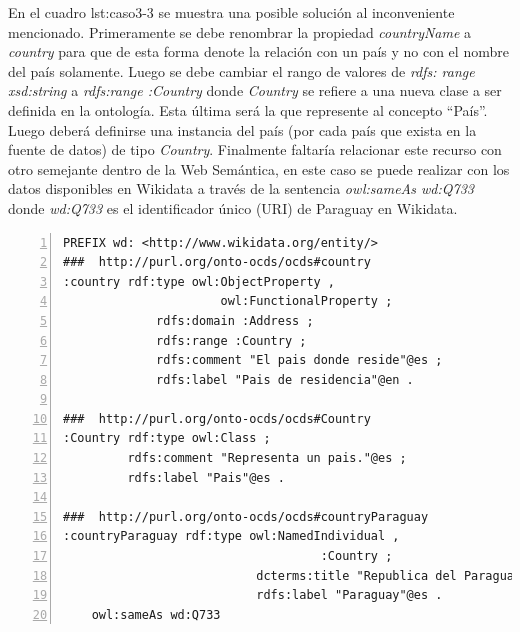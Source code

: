  En el cuadro {lst:caso3-3} se muestra una posible solución al inconveniente mencionado. Primeramente se debe renombrar la propiedad \textit{countryName} a \textit{country} para que de esta forma denote la relación con un país y no con el nombre del país solamente. Luego se debe cambiar el rango de valores de \textit{rdfs: range xsd:string}  a \textit{rdfs:range :Country }donde \textit{Country} se refiere a una nueva clase a ser definida en la ontología. Esta última será la que represente al concepto “País”. Luego deberá definirse una instancia del país (por cada país que exista en la fuente de datos) de tipo \textit{Country}. Finalmente faltaría relacionar este recurso con otro semejante dentro de la Web Semántica, en este caso se puede realizar con los datos disponibles en Wikidata a través de la sentencia \textit{owl:sameAs wd:Q733} donde \textit{wd:Q733} es el identificador único (URI) de Paraguay en Wikidata.\hfill \break

\noindent\begin{minipage}[c]{\textwidth}
 \begin{lstlisting}[captionpos=b, caption=Declaracion de la Clase Country, label={lst:caso3-3},  numbers=left,  numberstyle=\tiny\color{mygray},
    basicstyle=\footnotesize\ttfamily,frame=single]
PREFIX wd: <http://www.wikidata.org/entity/>
###  http://purl.org/onto-ocds/ocds#country
:country rdf:type owl:ObjectProperty ,
                      owl:FunctionalProperty ;
             rdfs:domain :Address ;
             rdfs:range :Country ;
             rdfs:comment "El pais donde reside"@es ;
             rdfs:label "Pais de residencia"@en .

###  http://purl.org/onto-ocds/ocds#Country
:Country rdf:type owl:Class ;
         rdfs:comment "Representa un pais."@es ;
         rdfs:label "Pais"@es .

###  http://purl.org/onto-ocds/ocds#countryParaguay
:countryParaguay rdf:type owl:NamedIndividual ,
                                    :Country ;
                           dcterms:title "Republica del Paraguay"@es ;
                           rdfs:label "Paraguay"@es .
    owl:sameAs wd:Q733
 \end{lstlisting}
\end{minipage}
